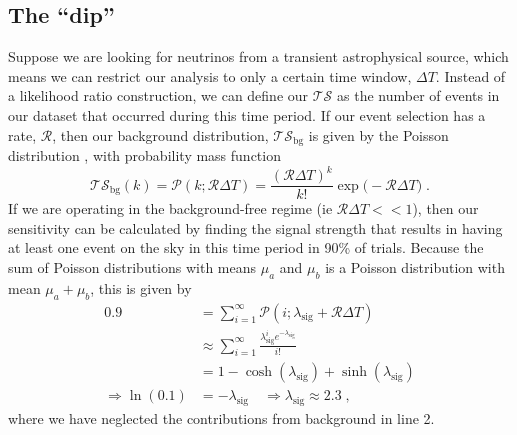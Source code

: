 \documentclass[a4paper,11pt]{article}
\newcommand\ts{\mathcal{TS}}
\newcommand\tsbg{\mathcal{TS_{\mathrm{bg}}}}
\begin{document}
\subsection{The ``dip''}
Suppose we are looking for neutrinos from a transient astrophysical source, which means we can restrict our analysis to only a certain time window, $\Delta T$. Instead of a likelihood ratio construction, we can define our $\ts$ as the number of events in our dataset that occurred during this time period. If our event selection has a rate, $\mathcal{R}$, then our background distribution, $\tsbg$ is given by the Poisson distribution , with probability mass function
\begin{equation}
    \tsbg(k) = \mathcal{P}(k;\mathcal{R}\Delta T) = \frac{(\mathcal{R}\Delta T)^k}{k!}\exp{\big(-\mathcal{R}\Delta T\big)} \; .
\end{equation}
If we are operating in the background-free regime (ie $\mathcal{R}\Delta T << 1$), then our sensitivity can be calculated by finding the signal strength that results in having at least one event on the sky in this time period in 90\% of trials. Because the sum of Poisson distributions with means $\mu_a$ and $\mu_b$ is a Poisson distribution with mean $\mu_a + \mu_b$, this is given by
\begin{align*}
    0.9 &= \sum_{i=1}^{\infty} \mathcal{P}(i ; \lambda_{\mathrm{sig}} + \mathcal{R}\Delta T) \\
    &\approx\sum_{i=1}^{\infty} \frac{\lambda_{\mathrm{sig}}^{i} e^{-\lambda_{\mathrm{sig}}}}{i !} \\
    &=1-\cosh (\lambda_{\mathrm{sig}})+\sinh (\lambda_{\mathrm{sig}}) \\
    \Rightarrow \ln (0.1)& =-\lambda_{\mathrm{sig}} \quad \Rightarrow \lambda_{\mathrm{sig}} \approx 2.3 \; ,
\end{align*}
where we have neglected the contributions from background in line 2.
\end{document}
